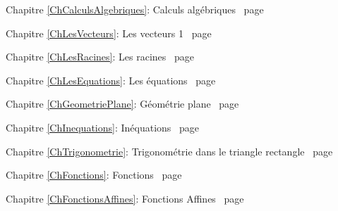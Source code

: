 \documentclass[TS]{sesamanuel}
\begin{document}
\begin{commentaire}

\textcolor{PartieFonction}{\PrerequisTitleFont 
Chapitre \ref{ChCalculsAlgebriques}: Calculs algébriques \dotfill\ page \pageref{ChCalculsAlgebriques}}

\vspace{2em}

\textcolor{PartieGeometrie}{\PrerequisTitleFont 
Chapitre \ref{ChLesVecteurs}: Les vecteurs 1 \dotfill\ page \pageref{ChLesVecteurs}}

\vspace{2em}

\textcolor{PartieFonction}{\PrerequisTitleFont 
Chapitre \ref{ChLesRacines}: Les racines \dotfill\ page \pageref{ChLesRacines}}

\vspace{2em}

\textcolor{PartieFonction}{\PrerequisTitleFont 
Chapitre \ref{ChLesEquations}: Les équations \dotfill\ page \pageref{ChLesEquations}}

\vspace{2em}

\textcolor{PartieGeometrie}{\PrerequisTitleFont 
Chapitre \ref{ChGeometriePlane}: Géométrie plane \dotfill\ page \pageref{ChGeometriePlane}}

\vspace{2em}

\textcolor{PartieFonction}{\PrerequisTitleFont 
Chapitre \ref{ChInequations}: Inéquations \dotfill\ page \pageref{ChInequations}}

\vspace{2em}

\textcolor{PartieGeometrie}{\PrerequisTitleFont 
Chapitre \ref{ChTrigonometrie}: Trigonométrie dans le triangle rectangle \dotfill\ page \pageref{ChTrigonometrie}}

\vspace{2em}

\textcolor{PartieFonction}{\PrerequisTitleFont 
Chapitre \ref{ChFonctions}: Fonctions \dotfill\ page \pageref{ChFonctions}}

\vspace{2em}

\textcolor{PartieFonction}{\PrerequisTitleFont 
Chapitre \ref{ChFonctionsAffines}: Fonctions Affines \dotfill\ page \pageref{ChFonctionsAffines}}

\vspace{2em}

\end{commentaire}
\end{document}

